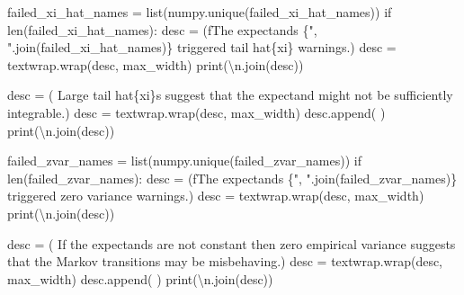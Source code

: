 \documentclass[
  letterpaper,
  DIV=11,
  numbers=noendperiod]{scrartcl}
\newenvironment{Shaded}{\begin{snugshade}}{\end{snugshade}}
\newcommand{\BuiltInTok}[1]{\textcolor[rgb]{0.00,0.23,0.31}{#1}}
\newcommand{\CharTok}[1]{\textcolor[rgb]{0.13,0.47,0.30}{#1}}
\newcommand{\ControlFlowTok}[1]{\textcolor[rgb]{0.00,0.23,0.31}{#1}}
\newcommand{\NormalTok}[1]{\textcolor[rgb]{0.00,0.23,0.31}{#1}}
\newcommand{\OperatorTok}[1]{\textcolor[rgb]{0.37,0.37,0.37}{#1}}
\newcommand{\SpecialCharTok}[1]{\textcolor[rgb]{0.37,0.37,0.37}{#1}}
\newcommand{\SpecialStringTok}[1]{\textcolor[rgb]{0.13,0.47,0.30}{#1}}
\newcommand{\StringTok}[1]{\textcolor[rgb]{0.13,0.47,0.30}{#1}}
\begin{document}
\begin{Shaded}
\begin{Highlighting}[]
\NormalTok{  failed\_xi\_hat\_names }\OperatorTok{=} \BuiltInTok{list}\NormalTok{(numpy.unique(failed\_xi\_hat\_names))}
  \ControlFlowTok{if} \BuiltInTok{len}\NormalTok{(failed\_xi\_hat\_names):}
\NormalTok{    desc }\OperatorTok{=}\NormalTok{ (}\SpecialStringTok{f\textquotesingle{}The expectands }\SpecialCharTok{\{}\StringTok{", "}\SpecialCharTok{.}\NormalTok{join(failed\_xi\_hat\_names)}\SpecialCharTok{\}}\SpecialStringTok{ \textquotesingle{}}
             \StringTok{\textquotesingle{}triggered tail hat}\SpecialCharTok{\{xi\}}\StringTok{ warnings.\textquotesingle{}}\NormalTok{)}
\NormalTok{    desc }\OperatorTok{=}\NormalTok{ textwrap.wrap(desc, max\_width)}
    \BuiltInTok{print}\NormalTok{(}\StringTok{\textquotesingle{}}\CharTok{\textbackslash{}n}\StringTok{\textquotesingle{}}\NormalTok{.join(desc))}
    
\NormalTok{    desc }\OperatorTok{=}\NormalTok{ (}\StringTok{\textquotesingle{}  Large tail hat}\SpecialCharTok{\{xi\}}\StringTok{s suggest that the expectand \textquotesingle{}}
            \StringTok{\textquotesingle{}might not be sufficiently integrable.\textquotesingle{}}\NormalTok{)}
\NormalTok{    desc }\OperatorTok{=}\NormalTok{ textwrap.wrap(desc, max\_width)}
\NormalTok{    desc.append(}\StringTok{\textquotesingle{} \textquotesingle{}}\NormalTok{)}
    \BuiltInTok{print}\NormalTok{(}\StringTok{\textquotesingle{}}\CharTok{\textbackslash{}n}\StringTok{\textquotesingle{}}\NormalTok{.join(desc))}
  
\NormalTok{  failed\_zvar\_names }\OperatorTok{=} \BuiltInTok{list}\NormalTok{(numpy.unique(failed\_zvar\_names))}
  \ControlFlowTok{if} \BuiltInTok{len}\NormalTok{(failed\_zvar\_names):}
\NormalTok{    desc }\OperatorTok{=}\NormalTok{ (}\SpecialStringTok{f\textquotesingle{}The expectands }\SpecialCharTok{\{}\StringTok{", "}\SpecialCharTok{.}\NormalTok{join(failed\_zvar\_names)}\SpecialCharTok{\}}\SpecialStringTok{ \textquotesingle{}}
             \StringTok{\textquotesingle{}triggered zero variance warnings.\textquotesingle{}}\NormalTok{)}
\NormalTok{    desc }\OperatorTok{=}\NormalTok{ textwrap.wrap(desc, max\_width)}
    \BuiltInTok{print}\NormalTok{(}\StringTok{\textquotesingle{}}\CharTok{\textbackslash{}n}\StringTok{\textquotesingle{}}\NormalTok{.join(desc))}
    
\NormalTok{    desc }\OperatorTok{=}\NormalTok{ (}\StringTok{\textquotesingle{}  If the expectands are not constant then zero empirical\textquotesingle{}}
            \StringTok{\textquotesingle{} variance suggests that the Markov\textquotesingle{}}
            \StringTok{\textquotesingle{} transitions may be misbehaving.\textquotesingle{}}\NormalTok{)}
\NormalTok{    desc }\OperatorTok{=}\NormalTok{ textwrap.wrap(desc, max\_width)}
\NormalTok{    desc.append(}\StringTok{\textquotesingle{} \textquotesingle{}}\NormalTok{)}
    \BuiltInTok{print}\NormalTok{(}\StringTok{\textquotesingle{}}\CharTok{\textbackslash{}n}\StringTok{\textquotesingle{}}\NormalTok{.join(desc))}
      

\end{Highlighting}
\end{Shaded}
\end{document}
